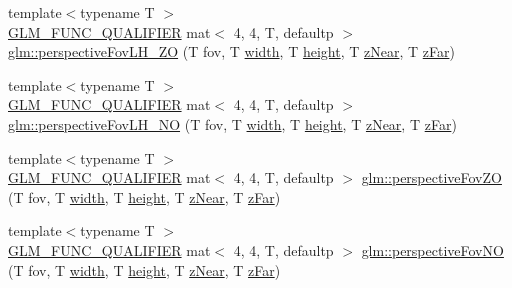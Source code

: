 \begin{DoxyCompactItemize}
\item 
{\footnotesize template$<$typename T $>$ }\\\mbox{\hyperlink{setup_8hpp_a33fdea6f91c5f834105f7415e2a64407}{G\+L\+M\+\_\+\+F\+U\+N\+C\+\_\+\+Q\+U\+A\+L\+I\+F\+I\+ER}} mat$<$ 4, 4, T, defaultp $>$ \mbox{\hyperlink{group__gtc__matrix__transform_gabdd37014f529e25b2fa1b3ba06c10d5c}{glm\+::perspective\+Fov\+L\+H\+\_\+\+ZO}} (T fov, T \mbox{\hyperlink{_s_d_l__opengl_8h_a9a82cf3caff84cabc4598e2619faac17}{width}}, T \mbox{\hyperlink{_s_d_l__opengl_8h_aa352f2804b9902ac30769c00dde75d5f}{height}}, T \mbox{\hyperlink{_s_d_l__opengl__glext_8h_a12d99226e590bbaaf0be69169eeb4834}{z\+Near}}, T \mbox{\hyperlink{_s_d_l__opengl__glext_8h_a1052a8235df129542aea6da80fbec6a1}{z\+Far}})
\item 
{\footnotesize template$<$typename T $>$ }\\\mbox{\hyperlink{setup_8hpp_a33fdea6f91c5f834105f7415e2a64407}{G\+L\+M\+\_\+\+F\+U\+N\+C\+\_\+\+Q\+U\+A\+L\+I\+F\+I\+ER}} mat$<$ 4, 4, T, defaultp $>$ \mbox{\hyperlink{group__gtc__matrix__transform_gad18a4495b77530317327e8d466488c1a}{glm\+::perspective\+Fov\+L\+H\+\_\+\+NO}} (T fov, T \mbox{\hyperlink{_s_d_l__opengl_8h_a9a82cf3caff84cabc4598e2619faac17}{width}}, T \mbox{\hyperlink{_s_d_l__opengl_8h_aa352f2804b9902ac30769c00dde75d5f}{height}}, T \mbox{\hyperlink{_s_d_l__opengl__glext_8h_a12d99226e590bbaaf0be69169eeb4834}{z\+Near}}, T \mbox{\hyperlink{_s_d_l__opengl__glext_8h_a1052a8235df129542aea6da80fbec6a1}{z\+Far}})
\item 
{\footnotesize template$<$typename T $>$ }\\\mbox{\hyperlink{setup_8hpp_a33fdea6f91c5f834105f7415e2a64407}{G\+L\+M\+\_\+\+F\+U\+N\+C\+\_\+\+Q\+U\+A\+L\+I\+F\+I\+ER}} mat$<$ 4, 4, T, defaultp $>$ \mbox{\hyperlink{group__gtc__matrix__transform_ga4bc69fa1d1f95128430aa3d2a712390b}{glm\+::perspective\+Fov\+ZO}} (T fov, T \mbox{\hyperlink{_s_d_l__opengl_8h_a9a82cf3caff84cabc4598e2619faac17}{width}}, T \mbox{\hyperlink{_s_d_l__opengl_8h_aa352f2804b9902ac30769c00dde75d5f}{height}}, T \mbox{\hyperlink{_s_d_l__opengl__glext_8h_a12d99226e590bbaaf0be69169eeb4834}{z\+Near}}, T \mbox{\hyperlink{_s_d_l__opengl__glext_8h_a1052a8235df129542aea6da80fbec6a1}{z\+Far}})
\item 
{\footnotesize template$<$typename T $>$ }\\\mbox{\hyperlink{setup_8hpp_a33fdea6f91c5f834105f7415e2a64407}{G\+L\+M\+\_\+\+F\+U\+N\+C\+\_\+\+Q\+U\+A\+L\+I\+F\+I\+ER}} mat$<$ 4, 4, T, defaultp $>$ \mbox{\hyperlink{group__gtc__matrix__transform_gaf30e7bd3b1387a6776433dd5383e6633}{glm\+::perspective\+Fov\+NO}} (T fov, T \mbox{\hyperlink{_s_d_l__opengl_8h_a9a82cf3caff84cabc4598e2619faac17}{width}}, T \mbox{\hyperlink{_s_d_l__opengl_8h_aa352f2804b9902ac30769c00dde75d5f}{height}}, T \mbox{\hyperlink{_s_d_l__opengl__glext_8h_a12d99226e590bbaaf0be69169eeb4834}{z\+Near}}, T \mbox{\hyperlink{_s_d_l__opengl__glext_8h_a1052a8235df129542aea6da80fbec6a1}{z\+Far}})

\end{DoxyCompactItemize}
